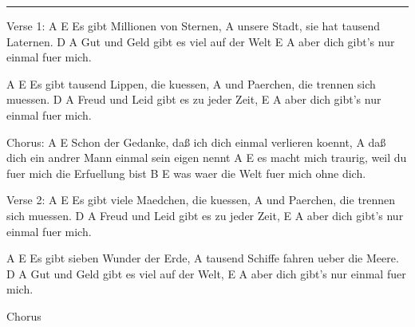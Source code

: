 \noindent\rule{\columnwidth}{1pt}

\begin{lstsong}
Verse 1:
     A                       E
Es gibt Millionen von Sternen,
                                A
unsere Stadt, sie hat tausend Laternen.
        D                         A
Gut und Geld gibt es viel auf der Welt
     E                           A
aber dich gibt's nur einmal fuer mich.

   A                             E
Es gibt tausend Lippen, die kuessen,
                              A
und Paerchen, die trennen sich muessen.
          D                     A
Freud und Leid gibt es zu jeder Zeit,
     E                           A
aber dich gibt's nur einmal fuer mich.
 
Chorus:
 A                                         E
Schon der Gedanke, daß ich dich einmal verlieren koennt,
                                     A
daß dich ein andrer Mann einmal sein eigen nennt
 A                                             E
es macht mich traurig, weil du fuer mich die Erfuellung bist
             B                   E
was waer die Welt fuer mich ohne dich.
 
Verse 2:
  A                            E
Es gibt viele Maedchen, die kuessen,
                              A
und Paerchen, die trennen sich muessen.
          D                     A
Freud und Leid gibt es zu jeder Zeit,
     E                           A
aber dich gibt's nur einmal fuer mich.

   A                        E
Es gibt sieben Wunder der Erde,
                                    A
tausend Schiffe fahren ueber die Meere.
        D                         A
Gut und Geld gibt es viel auf der Welt,
     E                           A
aber dich gibt's nur einmal fuer mich.

Chorus
\end{lstsong}
\newpage

